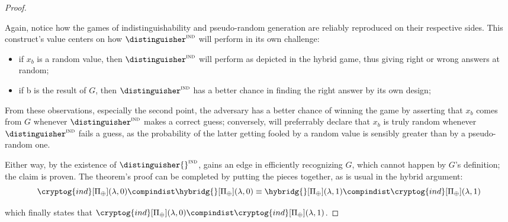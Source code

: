 \begin{proof}
\begin{cryptoredux}



        \cseqdelay

    \end{cryptoredux}

    Again, notice how the games of indistinguishability and pseudo-random generation are reliably reproduced on their respective sides. This construct's value centers on how $\distinguisher^\textsc{ind}$ will perform in its own challenge:
    \begin{itemize}
        \item if $x_b$ is a random value, then $\distinguisher^\textsc{ind}$ will perform as depicted in the hybrid game, thus giving right or wrong answers at random;
        \item if b is the result of $G$, then $\distinguisher^\textsc{ind}$ has a better chance in finding the right answer by its own design;
    \end{itemize}
    From these observations, especially the second point, the adversary \adversary{} has a better chance of winning the \prg{} game by asserting that $x_b$ comes from $G$ whenever $\distinguisher^\textsc{ind}$ makes a correct guess; conversely, \adversary{} will preferrably declare that $x_b$ is truly random whenever $\distinguisher^\textsc{ind}$ fails a guess, as the probability of the latter getting fooled by a random value is sensibly greater than by a pseudo-random one.

    Either way, by the existence of $\distinguisher{}^\textsc{ind}$, \adversary{} gains an edge in efficiently recognizing $G$, which cannot happen by $G$'s definition; the claim is proven. The theorem's proof can be completed by putting the pieces together, as is usual in the hybrid argument:
    \[
        \cryptog{ind}[\Pi_\xor](\lambda, 0) \compindist
        \hybridg{}[\Pi_\xor](\lambda, 0) \equiv
        \hybridg{}[\Pi_\xor](\lambda, 1) \compindist
        \cryptog{ind}[\Pi_\xor](\lambda, 1)
    \]

    which finally states that $\cryptog{ind}[\Pi_\xor](\lambda, 0) \compindist \cryptog{ind}[\Pi_\xor](\lambda, 1)$.
\end{proof}
 


